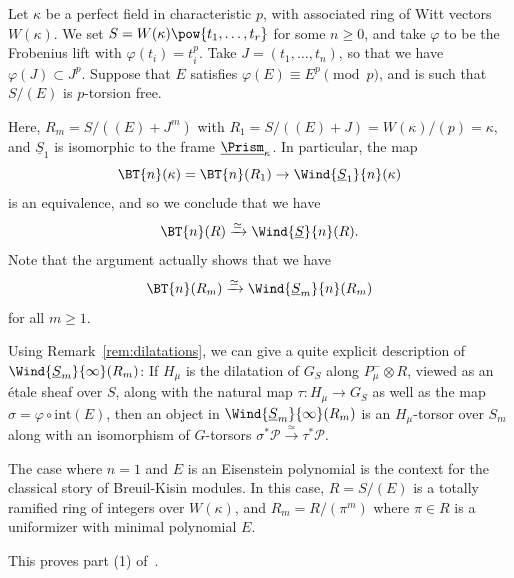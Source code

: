 \documentclass[10pt]{amsart}
\begin{document}
\begin{example}
\label{ex:BK_situation} 
 Let $\kappa$ be a perfect field in characteristic $p$, with associated ring of Witt vectors $W(\kappa)$. We set $S=W(\kappa)\pow{t_1,\ldots,t_r}$ for some $n\ge 0$, and take $\varphi$ to be the Frobenius lift with $\varphi(t_i) = t_i^p$.  Take $J=(t_1,\ldots,t_n)$, so that we have $\varphi(J)\subset J^p$. Suppose that $E$ satisfies $\varphi(E)\equiv E^p\pmod{p}$, and is such that $S/(E)$ is $p$-torsion free. 


Here, $R_m = S/((E)+J^m)$ with $R_1 = S/((E)+J) = W(\kappa)/(p) = \kappa$, and $\underline{S}_1$ is isomorphic to the frame $\underline{\Prism}_\kappa$. In particular, the map
\[
\BT{n}(\kappa) = \BT{n}(R_1)\to \Wind{\underline{S}_1}{n}(\kappa)
\]
is an equivalence, and so we conclude that we have
\[
\BT{n}(R) \xrightarrow{\simeq} \Wind{\underline{S}}{n}(R).
\]
Note that the argument actually shows that we have
\[
\BT{n}(R_m)\xrightarrow{\simeq}\Wind{\underline{S}_m}{n}(R_m)
\]
for all $m\ge 1$.

Using Remark~\ref{rem:dilatations}, we can give a quite explicit description of $\Wind{\underline{S}_m}{\infty}(R_m)$: If $H_\mu$ is the dilatation of $G_S$ along $P^-_\mu\otimes R$, viewed as an \'etale sheaf over $S$, along with the natural map $\tau:H_\mu\to G_S$ as well as the map $\sigma = \varphi\circ\mathrm{int}(E)$, then an object in $\Wind{\underline{S}_m}{\infty}(R_m)$ is an $H_\mu$-torsor over $S_m$ along with an isomorphism of $G$-torsors $\sigma^*\mathcal{P}\xrightarrow{\simeq}\tau^* \mathcal{P}$. 


The case where $n=1$ and $E$ is an Eisenstein polynomial is the context for the classical story of Breuil-Kisin modules. In this case, $R=S/(E)$ is a totally ramified ring of integers over $W(\kappa)$, and $R_m = R/(\pi^m)$ where $\pi\in R$ is a uniformizer with minimal polynomial $E$. 

This proves part (1) of~\cite[Conjecture 7.1.2]{ito2023deformation}.
\end{example}
\end{document}
